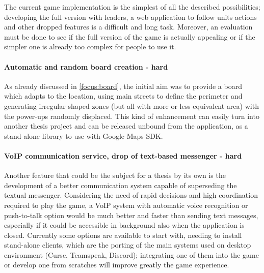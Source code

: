 	The current game implementation is the simplest of all the described possibilities; developing the full version with leaders, a web application to follow units actions and other dropped features is a difficult and long task. Moreover, an evaluation must be done to see if the full version of the game is actually appealing or if the simpler one is already too complex for people to use it.
	
	\paragraph{Automatic and random board creation - hard}
	
	As already discussed in \autoref{focus:board}, the initial aim was to provide a board which adapts to the location, using main streets to define the perimeter and generating irregular shaped zones (but all with more or less equivalent area) with the power-ups randomly displaced. This kind of enhancement can easily turn into another thesis project and can be released unbound from the application, as a stand-alone library to use with Google Maps SDK.
	
	\paragraph{VoIP communication service, drop of text-based messenger - hard}
	
	Another feature that could be the subject for a thesis by its own is the development of a better communication system capable of superseding the textual messenger. Considering the need of rapid decisions and high coordination required to play the game, a VoIP system with automatic voice recognition or push-to-talk option would be much better and faster than sending text messages, especially if it could be accessible in background also when the application is closed. Currently some options are available to start with, needing to install stand-alone clients, which are the porting of the main systems used on desktop environment (Curse, Teamspeak, Discord); integrating one of them into the game or develop one from scratches will improve greatly the game experience.